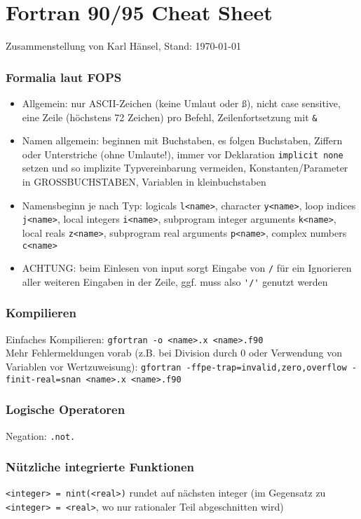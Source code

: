\documentclass[a4paper,10pt]{scrarticle}
\begin{document}
  
  \part*{Fortran 90/95 Cheat Sheet}
  Zusammenstellung von Karl Hänsel, Stand: \today
  \section{Formalia laut FOPS}
  \begin{itemize}
    \item Allgemein: nur ASCII-Zeichen (keine Umlaut oder ß), nicht case sensitive, eine Zeile (höchstens 72 Zeichen) pro Befehl, Zeilenfortsetzung mit \lstinline|&|
    \item Namen allgemein: beginnen mit Buchstaben, es folgen Buchstaben, Ziffern oder Unterstriche (ohne Umlaute!), immer vor Deklaration \lstinline|implicit none| setzen und so implizite Typvereinbarung vermeiden, Konstanten/Parameter in GROSSBUCHSTABEN, Variablen in kleinbuchstaben
    \item Namensbeginn je nach Typ: logicals \lstinline|l<name>|, character \lstinline|y<name>|, loop indices \lstinline|j<name>|, local integers \lstinline|i<name>|, subprogram integer arguments \lstinline|k<name>|, local reals \lstinline|z<name>|, subprogram real arguments \lstinline|p<name>|, complex numbers \lstinline|c<name>|
    \item ACHTUNG: beim Einlesen von input sorgt Eingabe von \lstinline|/| für ein Ignorieren aller weiteren Eingaben in der Zeile, ggf. muss also \lstinline|'/'| genutzt werden
  \end{itemize}
  
  \section{Kompilieren}
  Einfaches Kompilieren: \lstinline[style=neutral]|gfortran -o <name>.x <name>.f90| \\
  Mehr Fehlermeldungen vorab (z.B. bei Division durch 0 oder Verwendung von Variablen vor Wertzuweisung): \lstinline[style=neutral]|gfortran -ffpe-trap=invalid,zero,overflow -finit-real=snan <name>.x <name>.f90|
  \section{Logische Operatoren}
  Negation: \lstinline|.not.|
  
  \section{Nützliche integrierte Funktionen}
  \lstinline|<integer> = nint(<real>)| rundet auf nächsten integer (im Gegensatz zu \lstinline|<integer> = <real>|, wo nur rationaler Teil abgeschnitten wird)
  
  
\end{document}
